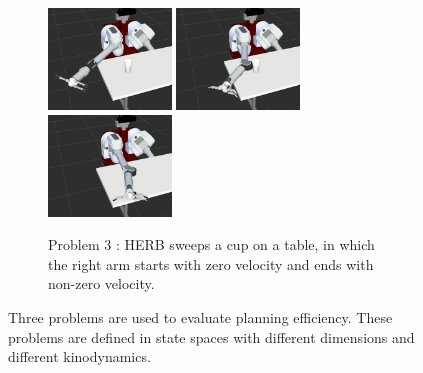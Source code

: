 \documentclass[letterpaper, 10 pt, conference]{ieeeconf}  %
\begin{document}
\begin{figure}[t!]
\begin{subfigure}[b]{\textwidth}
    \includegraphics[height=2.7cm]{fig/planning_efficiency/herb_batting_3}
    \includegraphics[height=2.7cm]{fig/planning_efficiency/herb_batting_4}
    \includegraphics[height=2.7cm]{fig/planning_efficiency/herb_batting_5}
	\caption{Problem 3 : HERB sweeps a cup on a table, in which the right arm starts with zero velocity and ends with non-zero velocity.}
	\label{fig:planning_efficiency:herb:example}
	\end{subfigure}
	\caption{\captionstyle Three problems are used to evaluate planning efficiency.
	These problems are defined in state spaces with different dimensions and different kinodynamics.}
	\label{fig:problems}
\end{figure} 
\end{document}
